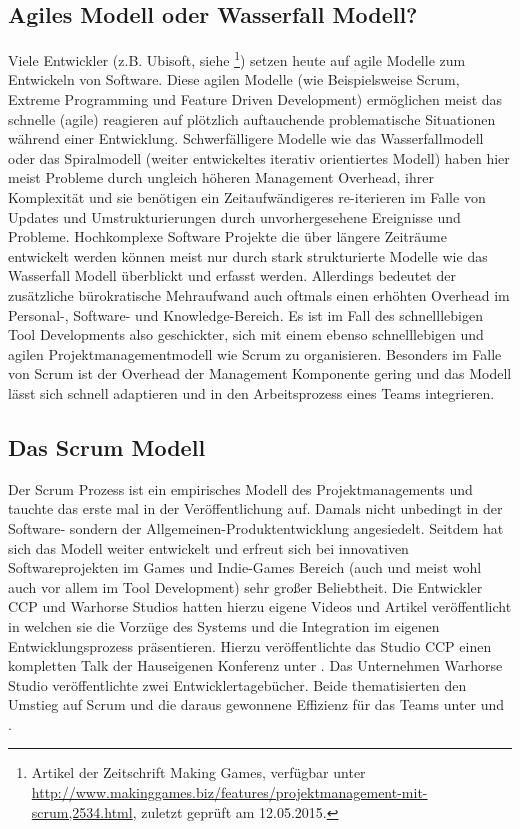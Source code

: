 \documentclass[pagesize, paper=a4, fontsize=12pt, titlepage=true, headings=small, headnosepline, abstractoff, liststotoc, nochapterprefix, plainheadsepline, twoside]{scrreprt}
\begin{document}
\subsection{Agiles Modell oder Wasserfall Modell?}
Viele Entwickler (z.B. Ubisoft, siehe \cite{MKG:Schmitz2014}\footnote{Artikel der Zeitschrift Making Games, verfügbar unter \url{http://www.makinggames.biz/features/projektmanagement-mit-scrum,2534.html}, zuletzt geprüft am 12.05.2015.}) setzen heute auf agile Modelle zum Entwickeln von Software. Diese agilen Modelle (wie Beispielsweise Scrum,  Extreme Programming und Feature Driven Development) ermöglichen meist das schnelle (agile) reagieren auf plötzlich auftauchende problematische Situationen während einer Entwicklung. Schwerfälligere Modelle wie das Wasserfallmodell oder das Spiralmodell (weiter entwickeltes iterativ orientiertes Modell) haben hier meist Probleme durch ungleich höheren Management Overhead, ihrer Komplexität und sie benötigen ein Zeitaufwändigeres re-iterieren im Falle von Updates und Umstrukturierungen durch unvorhergesehene Ereignisse und Probleme. Hochkomplexe Software Projekte die über längere Zeiträume entwickelt werden können meist nur durch stark strukturierte Modelle wie das Wasserfall Modell überblickt und erfasst werden. Allerdings bedeutet der zusätzliche bürokratische Mehraufwand auch oftmals einen erhöhten Overhead im Personal-, Software- und Knowledge-Bereich. Es ist im Fall des schnelllebigen Tool Developments also geschickter, sich mit einem ebenso schnelllebigen und agilen Projektmanagementmodell wie Scrum zu organisieren. Besonders im Falle von Scrum ist der Overhead der Management Komponente gering und das Modell lässt sich schnell adaptieren und in den Arbeitsprozess eines Teams integrieren.

\subsection{Das Scrum Modell}
Der Scrum Prozess ist ein empirisches Modell des Projektmanagements und tauchte das erste mal in der Veröffentlichung  auf. Damals nicht unbedingt in der Software- sondern der Allgemeinen-Produktentwicklung angesiedelt. Seitdem hat sich das Modell weiter entwickelt und erfreut sich bei innovativen Softwareprojekten im Games und Indie-Games Bereich (auch und meist wohl auch vor allem im Tool Development) sehr großer Beliebtheit. Die Entwickler CCP und Warhorse Studios hatten hierzu eigene Videos und Artikel veröffentlicht in welchen sie die Vorzüge des Systems und die Integration im eigenen Entwicklungsprozess präsentieren. Hierzu veröffentlichte das Studio CCP einen kompletten Talk der Hauseigenen Konferenz unter .  Das Unternehmen Warhorse Studio veröffentlichte zwei Entwicklertagebücher. Beide thematisierten den Umstieg auf Scrum und die daraus gewonnene Effizienz für das Teams unter  und .
\end{document}
